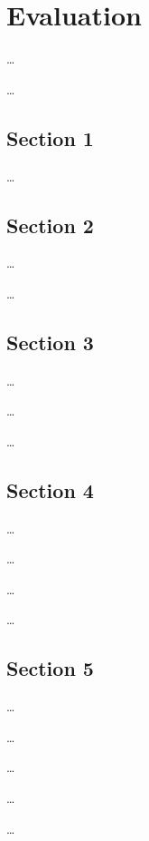 
\chapter{Evaluation}
\label{ch:Evaluation}

\dots

\dots


\section{Section 1}
\label{ch:Evaluation:sec:Section1}

\dots


\section{Section 2}
\label{ch:Evaluation:sec:Section2}

\dots

\dots


\section{Section 3}
\label{ch:Evaluation:sec:Section3}

\dots

\dots

\dots


\section{Section 4}
\label{ch:Evaluation:sec:Section4}

\dots

\dots

\dots

\dots

\section{Section 5}
\label{ch:Evaluation:sec:Section5}

\dots

\dots

\dots

\dots

\dots
